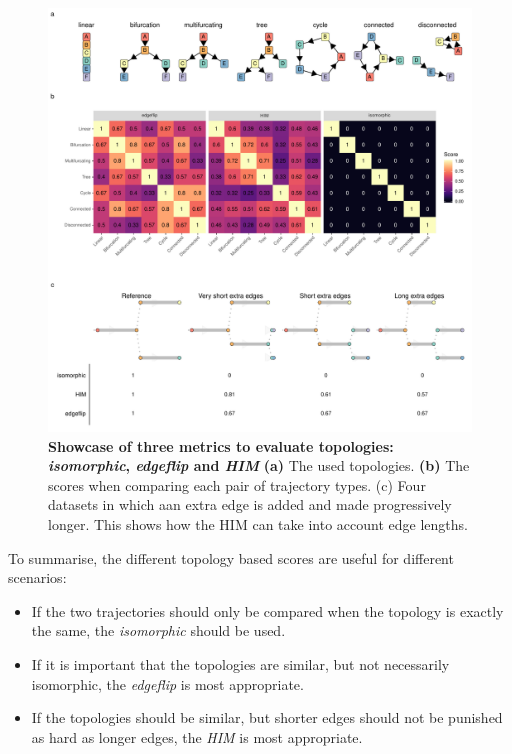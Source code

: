 \begin{figure}[htb!]
	\centering\includegraphics[width=\linewidth]{fig/snote1fig_2.pdf}
	\caption{
		\textbf{Showcase of three metrics to evaluate topologies: \textit{isomorphic}, \textit{edgeflip} and \textit{HIM}}
		\textbf{(a)} The used topologies. \textbf{(b)} The scores when comparing each pair of trajectory types. (c) Four datasets in which aan extra edge is added and made progressively longer. This shows how the HIM can take into account edge lengths.
	}
	\label{fig:snote1fig_2}
\end{figure}

To summarise, the different topology based scores are useful for different scenarios:

\begin{itemize}
	\item If the two trajectories should only be compared when the topology is exactly the same, the \textit{isomorphic} should be used.
	\item If it is important that the topologies are similar, but not necessarily isomorphic, the \textit{edgeflip} is most appropriate.
	\item If the topologies should be similar, but shorter edges should not be punished as hard as longer edges, the \textit{HIM} is most appropriate.
\end{itemize}

